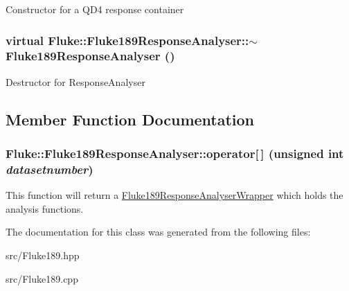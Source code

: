 Constructor for a QD4 response container \hypertarget{classFluke_1_1Fluke189ResponseAnalyser_a1a09156357eb1fd675eeb875cadd8c5d}{
\subsubsection[{$\sim$Fluke189ResponseAnalyser}]{\setlength{\rightskip}{0pt plus 5cm}virtual Fluke::Fluke189ResponseAnalyser::$\sim$Fluke189ResponseAnalyser ()}}
\label{classFluke_1_1Fluke189ResponseAnalyser_a1a09156357eb1fd675eeb875cadd8c5d}
Destructor for ResponseAnalyser 

\subsection{Member Function Documentation}
\hypertarget{classFluke_1_1Fluke189ResponseAnalyser_a45c800d717414e61975979c070416453}{
\subsubsection[{operator[]}]{ Fluke::Fluke189ResponseAnalyser::operator\mbox{[}$\,$\mbox{]} (unsigned int {\em datasetnumber})}}
\label{classFluke_1_1Fluke189ResponseAnalyser_a45c800d717414e61975979c070416453}
This function will return a \hyperlink{classFluke_1_1Fluke189ResponseAnalyserWrapper}{Fluke189ResponseAnalyserWrapper} which holds the analysis functions. 

The documentation for this class was generated from the following files:\begin{DoxyCompactItemize}
\item 
src/Fluke189.hpp\item 
src/Fluke189.cpp\end{DoxyCompactItemize}
